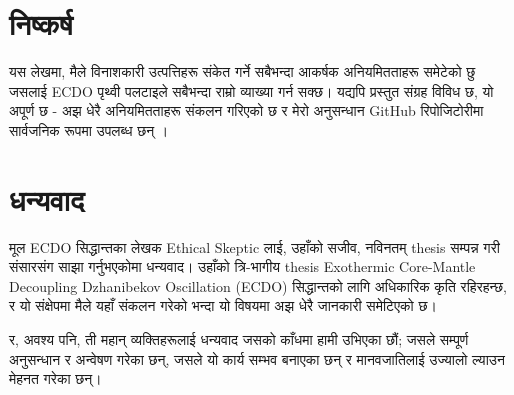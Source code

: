 \documentclass[10pt,twocolumn,letterpaper]{article}
\begin{document}
\section{निष्कर्ष}

यस लेखमा, मैले विनाशकारी उत्पत्तिहरू संकेत गर्ने सबैभन्दा आकर्षक अनियमितताहरू समेटेको छु जसलाई ECDO पृथ्वी पलटाइले सबैभन्दा राम्रो व्याख्या गर्न सक्छ। यद्यपि प्रस्तुत संग्रह विविध छ, यो अपूर्ण छ - अझ धेरै अनियमितताहरू संकलन गरिएको छ र मेरो अनुसन्धान GitHub रिपोजिटोरीमा सार्वजनिक रूपमा उपलब्ध छन् \cite{2}।
\section{धन्यवाद}

मूल ECDO सिद्धान्तका लेखक Ethical Skeptic लाई, उहाँको सजीव, नविनतम् thesis सम्पन्न गरी संसारसंग साझा गर्नुभएकोमा धन्यवाद। उहाँको त्रि-भागीय thesis \cite{1} Exothermic Core-Mantle Decoupling Dzhanibekov Oscillation (ECDO) सिद्धान्तको लागि अधिकारिक कृति रहिरहन्छ, र यो संक्षेपमा मैले यहाँ संकलन गरेको भन्दा यो विषयमा अझ धेरै जानकारी समेटिएको छ।

र, अवश्य पनि, ती महान् व्यक्तिहरूलाई धन्यवाद जसको काँधमा हामी उभिएका छौं; जसले सम्पूर्ण अनुसन्धान र अन्वेषण गरेका छन्, जसले यो कार्य सम्भव बनाएका छन् र मानवजातिलाई उज्यालो ल्याउन मेहनत गरेका छन्।

\clearpage
\twocolumn
{\small


}
\end{document}

